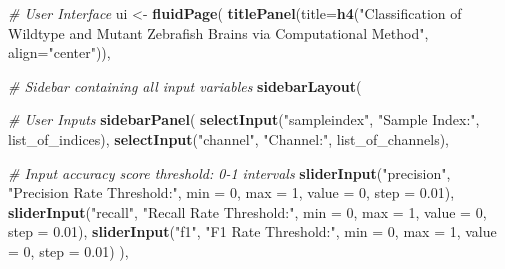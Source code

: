 \documentclass[10pt,letterpaper]{article}
\newenvironment{Shaded}{\begin{snugshade}}{\end{snugshade}}
\newcommand{\KeywordTok}[1]{\textcolor[rgb]{0.13,0.29,0.53}{\textbf{#1}}}
\newcommand{\DataTypeTok}[1]{\textcolor[rgb]{0.13,0.29,0.53}{#1}}
\newcommand{\DecValTok}[1]{\textcolor[rgb]{0.00,0.00,0.81}{#1}}
\newcommand{\FloatTok}[1]{\textcolor[rgb]{0.00,0.00,0.81}{#1}}
\newcommand{\StringTok}[1]{\textcolor[rgb]{0.31,0.60,0.02}{#1}}
\newcommand{\CommentTok}[1]{\textcolor[rgb]{0.56,0.35,0.01}{\textit{#1}}}
\newcommand{\NormalTok}[1]{#1}
\begin{document}
\begin{Shaded}
\begin{Highlighting}[]
\CommentTok{# User Interface}
\NormalTok{ui <-}\StringTok{ }\KeywordTok{fluidPage}\NormalTok{(}
  \KeywordTok{titlePanel}\NormalTok{(}\DataTypeTok{title=}\KeywordTok{h4}\NormalTok{(}\StringTok{"Classification of Wildtype and Mutant }
\StringTok{                      Zebrafish Brains via Computational Method"}\NormalTok{, }
                      \DataTypeTok{align=}\StringTok{"center"}\NormalTok{)),}
  
  \CommentTok{# Sidebar containing all input variables}
  \KeywordTok{sidebarLayout}\NormalTok{(}
    
    \CommentTok{# User Inputs}
    \KeywordTok{sidebarPanel}\NormalTok{(}
      \KeywordTok{selectInput}\NormalTok{(}\StringTok{"sampleindex"}\NormalTok{, }\StringTok{"Sample Index:"}\NormalTok{, list_of_indices),}
      \KeywordTok{selectInput}\NormalTok{(}\StringTok{"channel"}\NormalTok{, }\StringTok{"Channel:"}\NormalTok{, list_of_channels),}
      
      \CommentTok{# Input accuracy score threshold: 0-1 intervals}
      \KeywordTok{sliderInput}\NormalTok{(}\StringTok{"precision"}\NormalTok{, }\StringTok{"Precision Rate Threshold:"}\NormalTok{,}
                  \DataTypeTok{min =} \DecValTok{0}\NormalTok{, }\DataTypeTok{max =} \DecValTok{1}\NormalTok{,}
                  \DataTypeTok{value =} \DecValTok{0}\NormalTok{, }\DataTypeTok{step =} \FloatTok{0.01}\NormalTok{),}
      \KeywordTok{sliderInput}\NormalTok{(}\StringTok{"recall"}\NormalTok{, }\StringTok{"Recall Rate Threshold:"}\NormalTok{,}
                  \DataTypeTok{min =} \DecValTok{0}\NormalTok{, }\DataTypeTok{max =} \DecValTok{1}\NormalTok{,}
                  \DataTypeTok{value =} \DecValTok{0}\NormalTok{, }\DataTypeTok{step =} \FloatTok{0.01}\NormalTok{),}
      \KeywordTok{sliderInput}\NormalTok{(}\StringTok{"f1"}\NormalTok{, }\StringTok{"F1 Rate Threshold:"}\NormalTok{,}
                  \DataTypeTok{min =} \DecValTok{0}\NormalTok{, }\DataTypeTok{max =} \DecValTok{1}\NormalTok{,}
                  \DataTypeTok{value =} \DecValTok{0}\NormalTok{, }\DataTypeTok{step =} \FloatTok{0.01}\NormalTok{)}
\NormalTok{    ),}
    

\end{Highlighting}
\end{Shaded}
\end{document}
